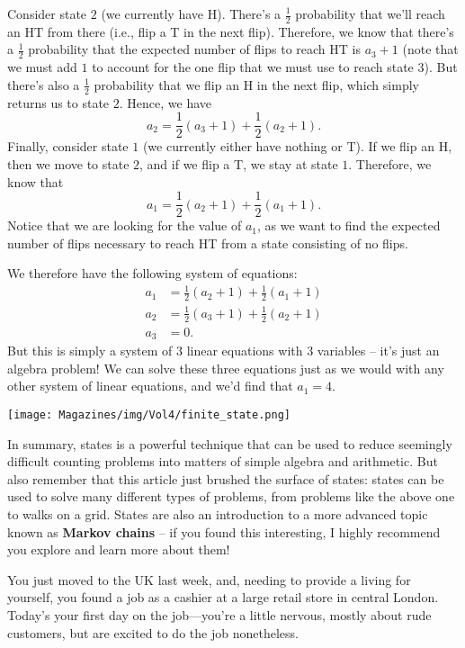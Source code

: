 \documentclass{article}
\begin{document}
\begin{multicols}{3}
Consider state $2$ (we currently have H). There's a $\frac{1}{2}$ probability that we'll reach an HT from there (i.e., flip a T in the next flip). Therefore, we know that there's a $\frac{1}{2}$ probability that the expected number of flips to reach HT is $a_3+1$ (note that we must add $1$ to account for the one flip that we must use to reach state $3$). But there's also a $\frac{1}{2}$ probability that we flip an H in the next flip, which simply returns us to state $2$. Hence, we have
\[a_2=\frac{1}{2}(a_3+1)+\frac{1}{2}(a_2+1).\]
Finally, consider state $1$ (we currently either have nothing or T). If we flip an H, then we move to state $2$, and if we flip a T, we stay at state $1$. Therefore, we know that
\[a_1=\frac{1}{2}(a_2+1)+\frac{1}{2}(a_1+1).\]
Notice that we are looking for the value of $a_1$, as we want to find the expected number of flips necessary to reach HT from a state consisting of no flips.

We therefore have the following system of equations:
\begin{align*}
a_1&=\frac{1}{2}(a_2+1)+\frac{1}{2}(a_1+1) \\
a_2&=\frac{1}{2}(a_3+1)+\frac{1}{2}(a_2+1) \\
a_3&=0.
\end{align*}
But this is simply a system of $3$ linear equations with $3$ variables -- it's just an algebra problem! We can solve these three equations just as we would with any other system of linear equations, and we'd find that $a_1=\boxed{4}$.

\begin{center}
\texttt{[image: Magazines/img/Vol4/finite\_state.png]}
\end{center}

In summary, states is a powerful technique that can be used to reduce seemingly difficult counting problems into matters of simple algebra and arithmetic. But also remember that this article just brushed the surface of states: states can be used to solve many different types of problems, from problems like the above one to walks on a grid. States are also an introduction to a more advanced topic known as \textbf{Markov chains} -- if you found this interesting, I highly recommend you explore and learn more about them!
\closearticle


 You just moved to the UK last week, and, needing to provide a living for yourself, you found a job as a cashier at a large retail store in central London. Today's your first day on the job—you're a little nervous, mostly about rude customers, but are excited to do the job nonetheless.


\end{multicols}
\end{document}
